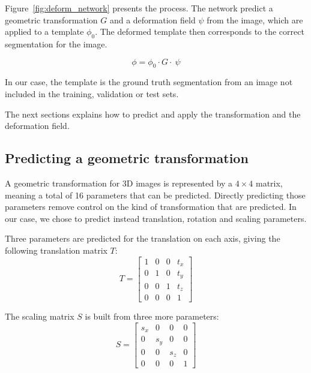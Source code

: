 Figure~\ref{fig:deform_network} presents the process. The network predict a geometric transformation $G$ and a deformation field $\psi$ from the image, which are applied to a template $\phi_0$. The deformed template then corresponds to the correct segmentation for the image.

\begin{equation}
    \phi = \phi_0 \cdot G \cdot \ \psi
\end{equation}

In our case, the template is the ground truth segmentation from an image not included in the training, validation or test sets.

The next sections explains how to predict and apply the transformation and the deformation field.

\subsection{Predicting a geometric transformation}

A geometric transformation for 3D images is represented by a $4 \times 4$ matrix, meaning a total of 16 parameters that can be predicted. Directly predicting those parameters remove control on the kind of transformation that are predicted. In our case, we chose to predict instead translation, rotation and scaling parameters. 

Three parameters are predicted for the translation on each axis, giving the following translation matrix $T$:
\begin{equation*}
    T = 
    \begin{bmatrix}
        1 & 0 & 0 & t_x \\
        0 & 1 & 0 & t_y \\
        0 & 0 & 1 & t_z \\ 
        0 & 0 & 0 & 1
    \end{bmatrix}
\end{equation*}

The scaling matrix $S$ is built from three more parameters:
\begin{equation*}
    S = 
    \begin{bmatrix}
        s_x & 0 & 0 & 0 \\
        0 & s_y & 0 & 0 \\
        0 & 0 & s_z & 0 \\ 
        0 & 0 & 0 & 1
    \end{bmatrix}
\end{equation*}


